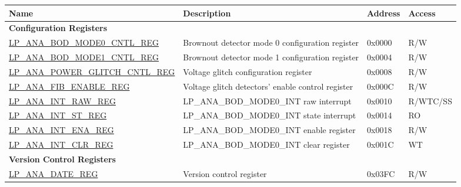 \begin{longtable}{ | l | p{7.2cm} | l | l | }
\hline\rowcolor{lightgray}
\textbf{Name} & \textbf{Description} &  \textbf{Address} & \textbf{Access} \\ \hline
\endhead
\multicolumn{4}{|l|}{\textbf{Configuration Registers}} \\ \hline
\hyperref[regdesc:LPANABODMODE0CNTLREG]{LP\_ANA\_BOD\_MODE0\_CNTL\_REG} & Brownout detector mode 0 configuration register & 0x0000 & R/W \\ \hline\hyperref[regdesc:LPANABODMODE1CNTLREG]{LP\_ANA\_BOD\_MODE1\_CNTL\_REG} &  Brownout detector mode 1 configuration register & 0x0004 & R/W \\\hline\hyperref[regdesc:LPANAPOWERGLITCHCNTLREG]{LP\_ANA\_POWER\_GLITCH\_CNTL\_REG} & Voltage glitch configuration register & 0x0008 & R/W \\\hline\hyperref[regdesc:LPANAFIBENABLEREG]{LP\_ANA\_FIB\_ENABLE\_REG} & Voltage glitch detectors' enable control register & 0x000C & R/W \\ \hline\hyperref[regdesc:LPANAINTRAWREG]{LP\_ANA\_INT\_RAW\_REG} &  LP\_ANA\_BOD\_MODE0\_INT raw interrupt & 0x0010 & R/WTC/SS \\ \hline\hyperref[regdesc:LPANAINTSTREG]{LP\_ANA\_INT\_ST\_REG} & LP\_ANA\_BOD\_MODE0\_INT state interrupt & 0x0014 & RO \\ \hline\hyperref[regdesc:LPANAINTENAREG]{LP\_ANA\_INT\_ENA\_REG} & LP\_ANA\_BOD\_MODE0\_INT enable register & 0x0018 & R/W \\ \hline\hyperref[regdesc:LPANAINTCLRREG]{LP\_ANA\_INT\_CLR\_REG} & LP\_ANA\_BOD\_MODE0\_INT clear register & 0x001C & WT \\ \hline
\multicolumn{4}{|l|}{\textbf{Version Control Registers}} \\ \hline
\hyperref[regdesc:LPANADATEREG]{LP\_ANA\_DATE\_REG} & Version control register & 0x03FC & R/W \\ \hline\end{longtable}